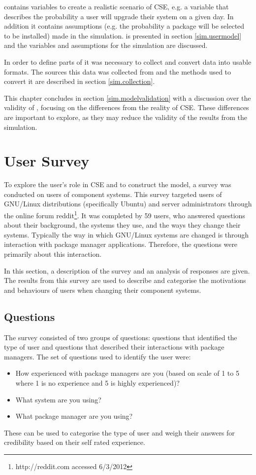 \usermodel contains variables to create a realistic scenario of CSE, e.g. a variable that describes the probability a user will upgrade their system on a given day.
In addition it contains assumptions (e.g. the probability a package will be selected to be installed) made in the simulation.
\usermodel is presented in section \ref{sim.usermodel} and the variables and assumptions for the simulation are discussed.

In order to define parts of \usermodel it was necessary to collect and convert data into usable formats.
The sources this data was collected from and the methods used to convert it are described in section \ref{sim.collection}.

This chapter concludes in section \ref{sim.modelvalidation} with a discussion over the validity of \usermodel, focusing on the differences from the reality of CSE.
These differences are important to explore, as they may reduce the validity of the results from the simulation.

\section{User Survey}
\label{strat.usersurvey}
To explore the user's role in CSE and to construct the \usermodel model, a survey was conducted on users of component systems.
This survey targeted users of GNU/Linux distributions (specifically Ubuntu) and server administrators through the online forum reddit\footnote{http://reddit.com accessed 6/3/2012}.
It was completed by 59 users, who answered questions about their background, the systems they use, and the ways they change their systems.
Typically the way in which GNU/Linux systems are changed is through interaction with package manager applications. 
Therefore, the questions were primarily about this interaction.

In this section, a description of the survey and an analysis of responses are given.
The results from this survey are used to describe and categorise the motivations and behaviours of users when changing their component systems.

\subsection{Questions}
The survey consisted of two groups of questions: questions that identified the type of user and questions that described their interactions with package managers.
The set of questions used to identify the user were:
\begin{itemize}
  \item How experienced with package managers are you (based on scale of 1 to 5 where 1 is no experience and 5 is highly experienced)? 
  \item What system are you using?
  \item What package manager are you using?
\end{itemize}
These can be used to categorise the type of user and weigh their answers for credibility based on their self rated experience.

